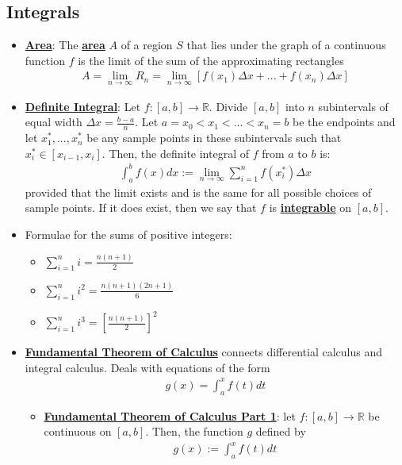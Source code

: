 \documentclass[11pt]{article}
\newcommand{\dfn}[1]{\underline{\textbf{#1}}}
\newcommand{\R}[0]{\mathbb{R}}
\begin{document}
\subsection{Integrals}
\begin{itemize}[noitemsep]
	\item \dfn{Area}: The \dfn{area} $A$ of a region $S$ that lies under the graph of a continuous function $f$ is the limit of the sum of the approximating rectangles 
	\begin{align}
		A = \lim_{n \rightarrow \infty} R_n = \lim_{n \rightarrow \infty} [ f(x_1) \Delta x + ...  + f(x_n) \Delta x ]	
	\end{align}
	\item \dfn{Definite Integral}: Let $f: [a,b] \rightarrow \R$. Divide $[a,b]$ into $n$ subintervals of equal width $\Delta x = \frac{b-a}{n}$. Let $a = x_0 < x_1 < ... < x_n =b$ be the endpoints and let $x_1^*, ..., x_n^*$ be any sample points in these subintervals such that $x_i^*  \in [x_{i-1}, x_i]$. Then, the definite integral of $f$ from $a$ to $b$ is: 
	\begin{align}
		\int_a^b f(x) dx := \lim_{n \rightarrow \infty} \sum_{i=1}^n f(x_i^*) \Delta x	
	\end{align}
	provided that the limit exists and is the same for all possible choices of sample points. If it does exist, then we say that $f$ is \dfn{integrable} on $[a,b]$.
	\item Formulae for the sums of positive integers: 
	\begin{itemize}[noitemsep]
		\item $ \sum_{i=1}^n i = \frac{n(n+1)}{2} $
		\item $ \sum_{i=1}^n i^2 = \frac{n(n+1)(2n+1)}{6} $
		\item $ \sum_{i=1}^n i^3 = \left[  \frac{n(n+1)}{2} \right]^2 $
	\end{itemize}
	\item \dfn{Fundamental Theorem of Calculus} connects differential calculus and integral calculus. Deals with equations of the form
	\begin{align}
		g(x) = \int_a^x f(t) dt 	
	\end{align}
	\begin{itemize}[noitemsep]
		\item \dfn{Fundamental Theorem of Calculus Part 1}: let $f: [a,b] \rightarrow \R$ be continuous on $[a,b]$. Then, the function $g$ defined by
		\begin{align}
			g(x) := \int_a^x f(t) dt 	
		\end{align}

\end{itemize}
\end{itemize}
\end{document}
